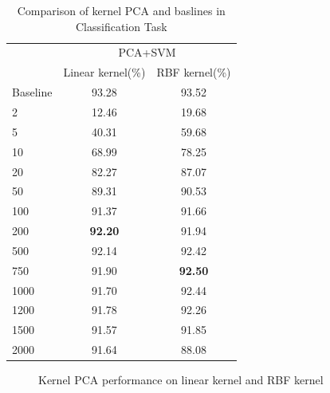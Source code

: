 \documentclass{article}
\begin{document}
\begin{table}[htbp]
	\centering
	\newcommand{\tabincell}[2]{\begin{tabular}{@{}#1@{}}#2\end{tabular}}
	\renewcommand\arraystretch{1.0}
	\caption{Comparison of kernel PCA and baslines in Classification Task}
	\label{baseline1}%
	\begin{tabular}{@{}p{2.5cm}<{\centering}|c|c}
		\hline
		\multirow{2}{*}{\diagbox[height=2\line,width=2.9cm,font=\tiny]{$d$}{Acc.}{$\mathit{M}$}} &\multicolumn{2}{c}{PCA+SVM}\\
		\cline{2-3}
			& {Linear kernel(\%)} & {RBF kernel(\%)}\\
		\cline{2-3}
		\hline
		Baseline & 93.28 & 93.52\\
		\hline
		2   & 12.46 & 19.68\\
		\hline
		5   & 40.31 & 59.68\\
		\hline
		10   & 68.99 & 78.25\\
		\hline
		20   & 82.27 & 87.07\\
		\hline
		50  & 89.31 & 90.53\\
		\hline
		100  & 91.37 & 91.66\\
		\hline
		200  & \textbf{92.20} & 91.94\\
		\hline
		500  & 92.14 & 92.42\\
		\hline
		750  & 91.90 & \textbf{92.50}\\
		\hline
		1000  & 91.70 & 92.44\\
		\hline
		1200  & 91.78 & 92.26\\
		\hline
		1500  & 91.57 & 91.85\\
		\hline
		2000  & 91.64 & 88.08\\
		\hline
	\end{tabular}
\end{table}

\begin{figure}[htbp]
\centering
{}
\quad
{}
\caption{Kernel PCA performance on linear kernel and RBF kernel}
\label{Fig1}
\end{figure}
\end{document}
